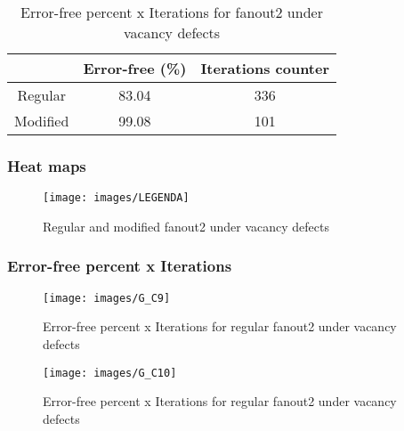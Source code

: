 \begin{table}[h]
\begin{center}
\begin{tabular}{|c|c|c|}
\hline
 & Error-free (\%) & Iterations counter \\
\hline
 Regular & 83.04 & 336 \\
\hline
 Modified & 99.08 & 101 \\
\hline

\end{tabular}
\caption{Error-free percent x Iterations for fanout2 under vacancy defects}
\end{center}
\end{table}

\pagebreak
\subsubsection{Heat maps}

\begin{figure}[h]
\center
{}
\hfill
{}
\linebreak
{\texttt{[image: images/LEGENDA]}
}
\caption{Regular and modified fanout2 under vacancy defects}
\label{figure:fanout2_t5}
\end{figure}

\subsubsection{Error-free percent x Iterations}

\begin{figure}[h!]
\center
\texttt{[image: images/G\_C9]}
\caption{Error-free percent x Iterations for regular fanout2 under vacancy defects}
\label{figure:fanout2_reg_gt5}
\end{figure}

\begin{figure}[h!]
\center
\texttt{[image: images/G\_C10]}
\caption{Error-free percent x Iterations for regular fanout2 under vacancy defects}
\label{figure:fanout2_mod_gt5}
\end{figure}
\pagebreak